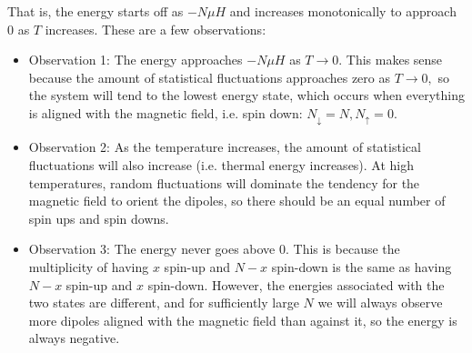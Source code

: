 \documentclass{article}
\numberwithin{equation}{section}
\begin{document}
\begin{enumerate}
\begin{enumerate}
        \begin{center}
        \end{center}
        That is, the energy starts off as $-N\mu H$ and increases monotonically to approach $0$ as $T$ increases. These are a few observations:
        \begin{itemize}
            \item Observation 1: The energy approaches $-N\mu H$ as $T\to 0.$ This makes sense because the amount of statistical fluctuations approaches zero as $T\to 0,$ so the system will tend to the lowest energy state, which occurs when everything is aligned with the magnetic field, i.e. spin down: $N_{\downarrow}=N,N_{\uparrow}=0.$
            \item Observation 2: As the temperature increases, the amount of statistical fluctuations will also increase (i.e. thermal energy increases). At high temperatures, random fluctuations will dominate the tendency for the magnetic field to orient the dipoles, so there should be an equal number of spin ups and spin downs.
            \item Observation 3: The energy never goes above $0.$ This is because the multiplicity of having $x$ spin-up and $N-x$ spin-down is the same as having $N-x$ spin-up and $x$ spin-down. However, the energies associated with the two states are different, and for sufficiently large $N$ we will always observe more dipoles aligned with the magnetic field than against it, so the energy is always negative. 
        \end{itemize}
    \end{enumerate}
\end{enumerate}
\end{document}
